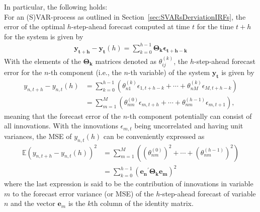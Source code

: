\documentclass[a4paper,11pt,listof=nochaptergap,oneside,pointednumbers,bibtotoc,bigheadings,liststotoc,hidelinks]{scrbook}
\theoremstyle{mysatz}
\theoremstyle{mydefinition}
\theoremstyle{mytheorem}
\theoremstyle{mybemerkung}
\newcommand{\vect}[1]{\boldsymbol{\mathbf{#1}}}
\begin{document}
In particular, the following holds:\\
For an (S)VAR-process as outlined in Section~\ref{sec:SVARsDerviationIRFs}, the error of the optimal $h$-step-ahead forecast computed at time $t$ for the time $t+h$ for the system is given by 
\begin{equation} \label{eq:FVED1}
\begin{split}
 		\vect{y_{t+h}} - \vect{y_t}(h) = \sum\limits_{k=0}^{h-1} \vect{\Theta_k}\vect{\epsilon_{t+h-k}}
\end{split}								
\end{equation}
With the elements of the $\vect{\Theta_k}$ matrices denoted as $\theta_{ij}^{(k)}$, the $h$-step-ahead forecast error for the $n$-th component (i.e., the $n$-th variable) of the system $\vect{y_{t}}$ is given by 
\begin{equation} \label{eq:FVED2}
\begin{split}
 		y_{n, t+h} - y_{n, t}(h) & = \sum\limits_{k=0}^{h-1} (\theta_{n1}^{(k)}\epsilon_{1, t+h-k} + \cdots + \theta_{nM}^{(k)}\epsilon_{M, t+h-k})\\
						& = \sum\limits_{m=1}^{M} (\theta_{nm}^{(0)}\epsilon_{m, t+h} + \cdots + \theta_{nm}^{(h-1)}\epsilon_{m, t+1}),
\end{split}								
\end{equation}
meaning that the forecast error of the $n$-th component potentially can consist of all innovations. With the innovations $\epsilon_{m,t}$ being uncorrelated and having unit variances, the MSE of $y_{n, t}(h)$ can be conveniently expressed as
\begin{equation} \label{eq:FVED3}
\begin{split}
 		\mathbb{E}(y_{n, t+h} - y_{n, t}(h))^2 & =  \sum\limits_{m=1}^{M} \left((\theta_{nm}^{(0)} )^2+ \cdots + (\theta_{nm}^{(h-1)})^2\right) \\
		& =  \sum\limits_{k=0}^{h-1} (\vect{e_n}^'\vect{\Theta_k}\vect{e_m})^2
\end{split}								
\end{equation}
where the last expression is said to be the contribution of innovations in variable $m$ to the forecast error variance (or MSE) of the $h$-step-ahead forecast of variable $n$ and the vector $\vect{e}_m$ is the $k$th column of the identity matrix.
\end{document}
